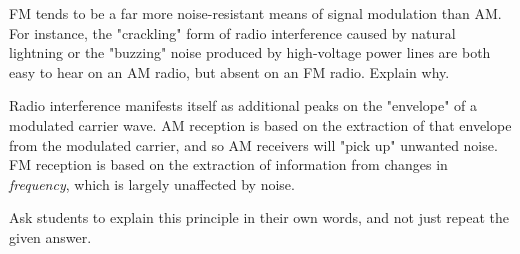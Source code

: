 

FM tends to be a far more noise-resistant means of signal modulation than AM.  For instance, the "crackling" form of radio interference caused by natural lightning or the "buzzing" noise produced by high-voltage power lines are both easy to hear on an AM radio, but absent on an FM radio.  Explain why.







Radio interference manifests itself as additional peaks on the "envelope" of a modulated carrier wave.  AM reception is based on the extraction of that envelope from the modulated carrier, and so AM receivers will "pick up" unwanted noise.  FM reception is based on the extraction of information from changes in {\it frequency}, which is largely unaffected by noise.







Ask students to explain this principle in their own words, and not just repeat the given answer.




